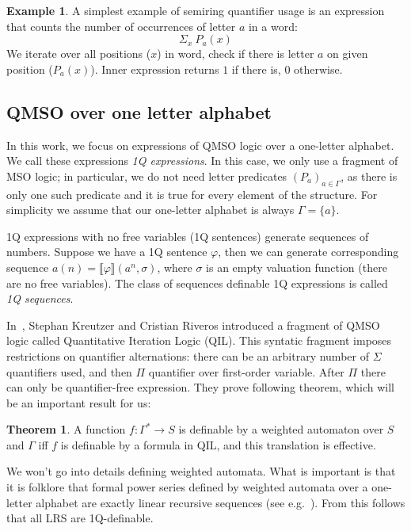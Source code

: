 \documentclass[12pt]{article}
\theoremstyle{definition}
\newtheorem{theorem}{Theorem}[section]
\newtheorem{example}{Example}[section]
\begin{document}
\begin{example}
    A simplest example of semiring quantifier usage is an expression that counts the number of occurrences of letter $a$ in a word:
    $$\Sigma_x \ P_a(x)$$
    We iterate over all positions ($x$) in word, check if there is letter $a$ on given position ($P_a(x)$). Inner expression returns $1$ if there is, $0$ otherwise. 
\end{example}

\subsection{QMSO over one letter alphabet}

In this work, we focus on expressions of QMSO logic over a one-letter alphabet. We call these expressions \emph{1Q expressions}. In this case, we only use a fragment of MSO logic; in particular, we do not need letter predicates $(P_a)_{a \in \Gamma}$, as there is only one such predicate and it is true for every element of the structure. For simplicity we assume that our one-letter alphabet is always $\Gamma = \{a\}$.

1Q expressions with no free variables (1Q sentences) generate sequences of numbers. Suppose we have a 1Q sentence $\varphi$, then we can generate corresponding sequence $a(n) = \llbracket \varphi \rrbracket (a^n, \sigma)$, where $\sigma$ is an empty valuation function (there are no free variables). The class of sequences definable 1Q expressions is called \emph{1Q sequences}.

In~\cite[Section IV]{KreutzerR13}, Stephan Kreutzer and Cristian Riveros introduced a fragment of QMSO logic called Quantitative Iteration Logic (QIL). This syntatic fragment imposes restrictions on quantifier alternations: there can be an arbitrary number of $\Sigma$ quantifiers used, and then $\Pi$ quantifier over first-order variable. After $\Pi$ there can only be quantifier-free expression. They prove following theorem, which will be an important result for us:

\begin{theorem}
\label{QILWL}
    A function $f: \Gamma^* \rightarrow S$ is definable by a weighted automaton over $S$ and $\Gamma$ iff $f$ is definable by a formula in QIL, and this translation is effective.
\end{theorem}

We won't go into details defining weighted automata. What is important is that it is folklore that formal power series defined by weighted automata over a one-letter alphabet are exactly linear recursive sequences (see e.g.~\cite{BarloyFLM22}). From this follows that all LRS are 1Q-definable.
\end{document}
